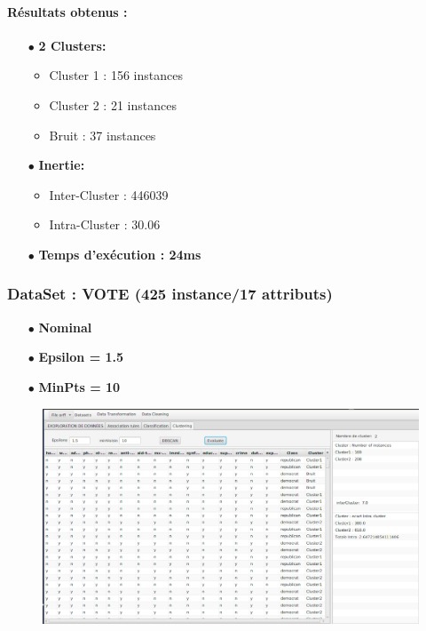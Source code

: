 \documentclass[12pt,a4paper,oneside]{book}
\begin{document}
\paragraph{Résultats obtenus :}
\begin{itemize}
	\item[$\bullet$] \textbf{2 Clusters: }
	\begin{itemize}
		\item Cluster 1 : 156 instances
		\item Cluster 2 : 21 instances
		\item Bruit : 37 instances
	\end{itemize}
	\item[$\bullet$] \textbf{Inertie:}
	\begin{itemize}
		\item Inter-Cluster : 446039
		\item Intra-Cluster : 30.06
	\end{itemize}
	\item[$\bullet$] \textbf{Temps d'exécution : 24ms}
\end{itemize}



\subsubsection*{DataSet : VOTE (425 instance/17 attributs)}
\begin{itemize}
	\item[$\bullet$] \textbf{Nominal}
	\item[$\bullet$] \textbf{Epsilon = 1.5}
	\item[$\bullet$] \textbf{MinPts = 10}
\end{itemize}

\begin{figure}[H]
	\centering
	\includegraphics[scale=0.38]{images/dbscan4-2.png}
	\label{labelname}%
\end{figure}
\end{document}
